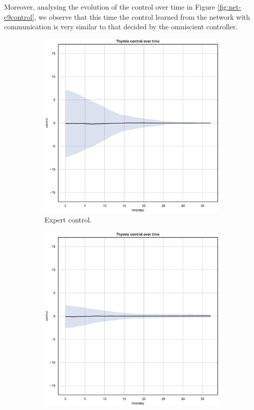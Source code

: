 Moreover, analysing the evolution of the control over time in Figure 
\ref{fig:net-c9control}, we observe that this time the control learned from the 
network with communication is very similar to that decided by the omniscient 
controller.
\begin{figure}[!htb]
	\begin{center}
		\begin{subfigure}[h]{0.35\textwidth}
			\includegraphics[width=\textwidth]{contents/images/net-d9/control-overtime-omniscient}%
			\caption{Expert control.}
		\end{subfigure}
		\hspace{1cm}
		\begin{subfigure}[h]{0.35\textwidth}
			\includegraphics[width=\textwidth]{contents/images/net-d9/control-overtime-learned_distributed}

\end{subfigure}
\end{center}
\end{figure}
